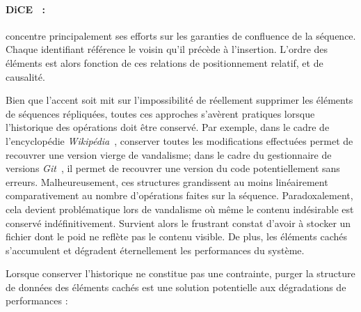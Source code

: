 \paragraph{DiCE~\cite{conway2014language} :} concentre principalement ses
efforts sur les garanties de confluence de la séquence. Chaque identifiant
référence le voisin qu'il précède à l'insertion. L'ordre des éléments est alors
fonction de ces relations de positionnement relatif, et de causalité.


Bien que l'accent soit mit sur l'impossibilité de réellement supprimer les
éléments de séquences répliquées, toutes ces approches s'avèrent pratiques
lorsque l'historique des opérations doit être conservé. Par exemple, dans le
cadre de l'encyclopédie \emph{Wikipédia}~\cite{wikipedia}, conserver toutes les
modifications effectuées permet de recouvrer une version vierge de vandalisme;
dans le cadre du gestionnaire de versions \emph{Git}~\cite{git}, il permet de
recouvrer une version du code potentiellement sans erreurs. Malheureusement, ces
structures grandissent au moins linéairement comparativement au nombre
d'opérations faites sur la séquence. Paradoxalement, cela devient problématique
lors de vandalisme où même le contenu indésirable est conservé
indéfinitivement. Survient alors le frustrant constat d'avoir à stocker un
fichier dont le poid ne reflète pas le contenu visible. De plus, les éléments
cachés s'accumulent et dégradent éternellement les performances du système.

Lorsque conserver l'historique ne constitue pas une contrainte, purger la
structure de données des éléments cachés est une solution potentielle aux
dégradations de performances :

